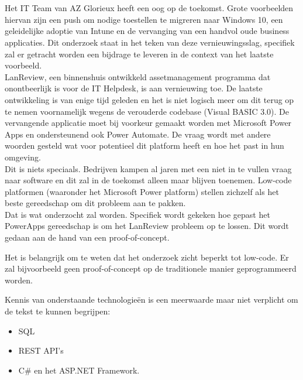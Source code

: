 
\chapter{}
\label{ch:inleiding}

Het IT Team van AZ Glorieux heeft een oog op de toekomst. Grote voorbeelden hiervan zijn een push om nodige toestellen te migreren naar Windows 10, een geleidelijke adoptie van Intune en de vervanging van een handvol oude business applicaties. Dit onderzoek staat in het teken van deze vernieuwingsslag, specifiek zal er getracht worden een bijdrage te leveren in de context van het laatste voorbeeld.\\
LanReview, een binnenshuis ontwikkeld assetmanagement programma dat onontbeerlijk is voor de IT Helpdesk, is aan vernieuwing toe. De laatste ontwikkeling is van enige tijd geleden en het is niet logisch meer om dit terug op te nemen voornamelijk wegens de verouderde codebase (Visual BASIC 3.0). De vervangende applicatie moet bij voorkeur gemaakt worden met Microsoft Power Apps en ondersteunend ook Power Automate. De vraag wordt met andere woorden gesteld wat voor potentieel dit platform heeft en hoe het past in hun omgeving.\\
Dit is niets speciaals. Bedrijven kampen al jaren met een niet in te vullen vraag naar software en dit zal in de toekomst alleen maar blijven toenemen. Low-code platformen (waaronder het Microsoft Power platform) stellen zichzelf als het beste gereedschap om dit probleem aan te pakken.\\
Dat is wat onderzocht zal worden. Specifiek wordt gekeken hoe gepast het PowerApps gereedschap is om het LanReview probleem op te lossen. Dit wordt gedaan aan de hand van een proof-of-concept.

Het is belangrijk om te weten dat het onderzoek zicht beperkt tot low-code. Er zal bijvoorbeeld geen proof-of-concept op de traditionele manier geprogrammeerd worden.

Kennis van onderstaande technologieën is een meerwaarde maar niet verplicht om de tekst te kunnen begrijpen:
\begin{itemize}
    \item SQL
    \item REST API's
    \item C\# en het ASP.NET Framework.
\end{itemize}

